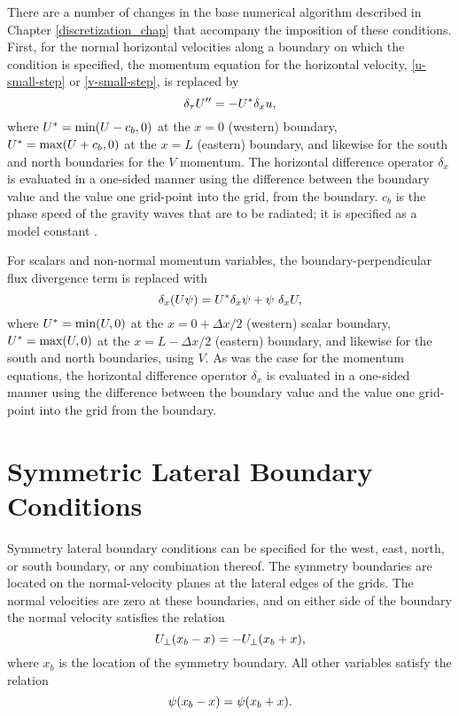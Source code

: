 There are a 
number of changes in the base numerical algorithm 
described in Chapter \ref{discretization_chap} 
that accompany the imposition of these
conditions.  First, for the normal horizontal velocities along
a boundary on which the condition is specified, the momentum
equation for the horizontal velocity, \eqref{u-small-step} or 
\eqref{v-small-step}, is replaced by
%
\begin{equation}
\delta_\tau U'' = - U^* \delta_x u,
\notag
\end{equation}
%
\noindent
where $U^* = \hbox{min}(U - c_b,0)$ at the $x = 0$ (western) boundary,
$U^* = \hbox{max}(U + c_b,0)$ at the $x = L$ (eastern) boundary, and
likewise for the south and north boundaries for the $V$ momentum.  The
horizontal difference operator $\delta_x$ is evaluated in a one-sided
manner using the difference between the boundary value and the
value one grid-point into the grid, from the boundary.  $c_b$ is the phase
speed of the gravity waves that are to be radiated; it is specified
as a model constant 
\citep[for more details see][]{klemp_and_lilly78, klemp78}.

For scalars and non-normal momentum variables, the
boundary-perpendicular flux divergence term is replaced with
%
\begin{equation}
\delta_x (U\psi) = U^* \delta_x \psi + \psi \ \delta_x U,
\notag
\end{equation}
%
\noindent
where $U^* = \hbox{min}(U,0)$ at the $x = 0 + \Delta x/2$ (western)
scalar boundary,
$U^* = \hbox{max}(U,0)$ at the $x = L - \Delta x/2$ (eastern) boundary, and
likewise for the south and north boundaries, using $V$.  As was the case
for the momentum equations, the
horizontal difference operator $\delta_x$ is evaluated in a one-sided
manner using the difference between the boundary value and the
value one grid-point into the grid from the boundary.

\section{Symmetric Lateral Boundary Conditions}

Symmetry lateral boundary conditions can be specified for the west,
east, north, or south boundary, or any combination thereof.  The
symmetry boundaries are located on the normal-velocity planes at the
lateral edges of the grids.  The normal velocities are zero at
these boundaries, and on either side of the boundary the normal 
velocity satisfies the relation
%
\begin{equation}
U_{\perp}(x_b - x) = - U_{\perp}(x_b + x),
\notag
\end{equation}
%
\noindent
where $x_b$ is the location of the symmetry boundary.
All other variables satisfy the relation
\begin{equation}
\psi(x_b - x) = \psi(x_b + x).
\notag
\end{equation}


